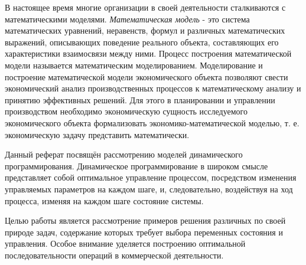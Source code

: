 
В настоящее время многие организации в своей деятельности сталкиваются с математическими моделями. \textit{Математическая модель} - это система математических уравнений, неравенств, формул и различных математических выражений, описывающих поведение реального объекта, составляющих его характеристики взаимосвязи между ними. Процесс построения математической модели называется математическим моделированием. Моделирование и построение математической модели экономического объекта позволяют свести экономический анализ производственных процессов к математическому анализу и принятию эффективных решений. Для этого в планировании и управлении производством необходимо экономическую сущность исследуемого экономического объекта формализовать экономико-математической моделью, т. е. экономическую задачу представить математически.

Данный реферат посвящён рассмотрению моделей динамического программирования. Динамическое программирование в широком смысле представляет собой оптимальное управление процессом, посредством изменения управляемых параметров на каждом шаге, и, следовательно, воздействуя на ход процесса, изменяя на каждом шаге состояние системы.

Целью работы является рассмотрение примеров решения различных по своей природе задач, содержание которых требует выбора переменных состояния и управления. Особое внимание уделяется построению оптимальной последовательности операций в коммерческой деятельности.